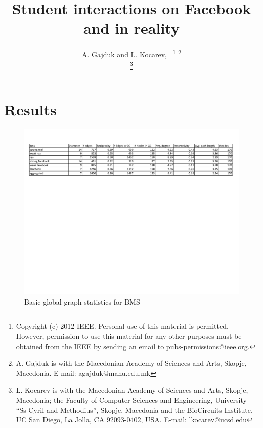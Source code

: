 \documentclass[journal]{IEEEtran}
\begin{document}
\title{Student interactions on Facebook and in reality}



\author{A. Gajduk and
        L. Kocarev,~%
\thanks{Copyright (c) 2012 IEEE. Personal use of this material is permitted. However, permission to use this material for any other purposes must be obtained from the IEEE by sending an email to pubs-permissions@ieee.org.}
\thanks{A. Gajduk is with the Macedonian Academy of Sciences and Arts, Skopje, Macedonia. E-mail: agajduk@manu.edu.mk}

\thanks{L. Kocarev is with the Macedonian Academy of Sciences and Arts, Skopje, Macedonia; the Faculty of Computer Sciences and Engineering, University ``Ss Cyril and Methodius'', Skopje, Macedonia and the BioCircuits Institute, UC San Diego, La Jolla, CA 92093-0402, USA. E-mail: lkocarev@ucsd.edu}
}

%
\maketitle
%

\section{Results}
\label{results}

\begin{figure}[!htb]
\centering
\includegraphics[scale=.65]{bms_stats.pdf}
\caption{Basic global graph statistics for BMS}
\end{figure}
\end{document}
